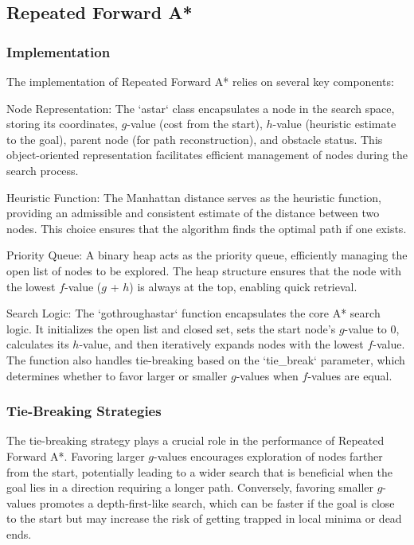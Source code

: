 \documentclass[12pt]{article}
\begin{document}
\subsection{ Repeated Forward A* }

\subsubsection{Implementation}

The implementation of Repeated Forward A* relies on several key components:

Node Representation: 
The `astar` class encapsulates a node in the search space, 
storing its coordinates, 
$g$-value (cost from the start), 
$h$-value (heuristic estimate to the goal), 
parent node (for path reconstruction), 
and obstacle status. 
This object-oriented representation facilitates efficient management of nodes during the search process.

Heuristic Function: 
The Manhattan distance serves as the heuristic function, 
providing an admissible and consistent estimate of the distance between two nodes. 
This choice ensures that the algorithm finds the optimal path if one exists.

Priority Queue: 
A binary heap acts as the priority queue, 
efficiently managing the open list of nodes to be explored. 
The heap structure ensures that the node with the lowest $f$-value 
($g$ + $h$) 
is always at the top, enabling quick retrieval.

Search Logic: 
The `gothroughastar` function encapsulates the core A* search logic. 
It initializes the open list and closed set, 
sets the start node's $g$-value to 0, 
calculates its $h$-value, 
and then iteratively expands nodes with the lowest $f$-value. 
The function also handles tie-breaking based on the `tie\_break` parameter, 
which determines whether to favor larger or smaller $g$-values when $f$-values are equal.

\subsubsection{Tie-Breaking Strategies}

The tie-breaking strategy plays a crucial role in the performance of Repeated Forward A*. 
Favoring larger $g$-values encourages exploration of nodes farther from the start, 
potentially leading to a wider search that is beneficial when the goal lies in a direction requiring a longer path. 
Conversely, 
favoring smaller $g$-values promotes a depth-first-like search, 
which can be faster if the goal is close to the start but may increase the risk of getting trapped in local minima or dead ends.
\end{document}
